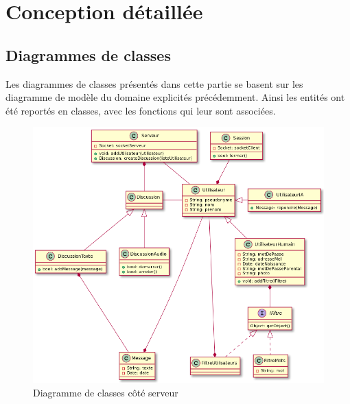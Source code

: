 \documentclass[a4paper,12pt]{article}
\begin{document}
	\newpage

	\section{Conception détaillée}

	\subsection{Diagrammes de classes}
	Les diagrammes de classes présentés dans cette partie se basent sur les diagramme de modèle du domaine explicités précédemment.
	Ainsi les entités ont été reportés en classes, avec les fonctions qui leur sont associées.
	\begin{figure}[H]
		\centerline{\includegraphics[width=16.5cm]{../diagrammes/img/classesServeur.png}}
		\caption{Diagramme de classes côté serveur}
	\end{figure}

	\newpage
\end{document}
